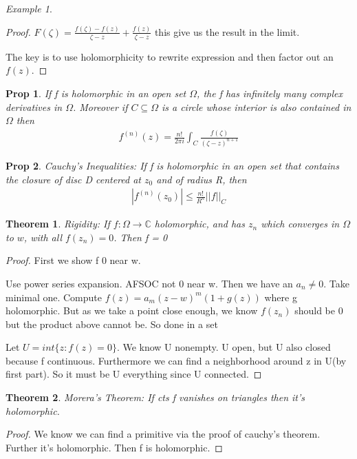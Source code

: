 \documentclass[11pt]{article}
\newcommand{\C}{\mathbb{C}}
\newtheorem{theorem}{Theorem}
\newtheorem{prop}{Prop}
\theoremstyle{remark}
\newtheorem{example}{Example}
\begin{document}
\begin{example}
\begin{proof}
	$F(\zeta) = \frac{f(\zeta) - f(z)}{\zeta - z} + \frac{f(z)}{\zeta  - z}$ this give us the result in the limit.

	The key is to use holomorphicity to rewrite expression and then factor out an $f(z)$. 

\end{proof}

\begin{prop}
	If f is holomorphic in an open set $\Omega$, the f has infinitely many complex derivatives in $\Omega$. Moreover if $C \subseteq \Omega$ is a circle whose interior is also contained in $\Omega$ then
	\begin{align*}
		f^{(n)}(z) = \frac{n!}{2 \pi i} \int_C \frac{f(\zeta)}{(\zeta - z)^{n+1}}
	\end{align*}
\end{prop}

\begin{prop}
	Cauchy's Inequalities: If f is holomorphic in an open set that contains the closure of disc D centered at $z_0$ and of radius R, then
	\begin{align*}
		|f^{(n)}(z_0)| \leq \frac{n!}{R^n}||f||_C
	\end{align*}
\end{prop}

\begin{theorem}
	\textit{Rigidity}: If $f : \Omega \to \C$ holomorphic, and has $z_n$ which converges in $\Omega$ to $w$, with all $f(z_n) = 0$. Then f = 0
\end{theorem}

\begin{proof}
	First we show f 0 near w. 

	Use power series expansion. AFSOC not 0 near w. Then we have an $a_n \neq 0$. Take minimal one. Compute $f(z) = a_m(z-w)^m(1+g(z))$ where g holomorphic. But as we take a point close enough, we know $f(z_n)$ should be 0 but the product above cannot be. So done in a set

	Let $U = int\{z: f(z) = 0\}$. We know U nonempty. U open, but U also closed because f continuous. Furthermore we can find a neighborhood around z in U(by first part). So it must be U everything since U connected. 
\end{proof}

\begin{theorem}
	Morera's Theorem:
	If cts f vanishes on triangles then it's holomorphic. 
\end{theorem}

\begin{proof}
	We know we can find a primitive via the proof of cauchy's theorem. Further it's holomorphic. Then f is holomorphic. 
\end{proof}


\end{example}
\end{document}
